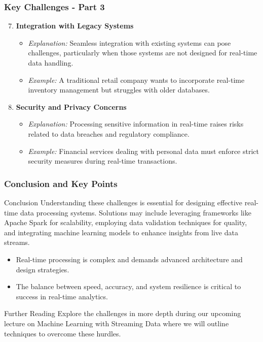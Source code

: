 \documentclass[aspectratio=169]{beamer}
\begin{document}
\begin{frame}[fragile]
    \frametitle{Key Challenges - Part 3}
    \begin{enumerate}
        \setcounter{enumi}{6} %
        \item \textbf{Integration with Legacy Systems}
        \begin{itemize}
            \item \textit{Explanation:} Seamless integration with existing systems can pose challenges, particularly when those systems are not designed for real-time data handling.
            \item \textit{Example:} A traditional retail company wants to incorporate real-time inventory management but struggles with older databases.
        \end{itemize}

        \item \textbf{Security and Privacy Concerns}
        \begin{itemize}
            \item \textit{Explanation:} Processing sensitive information in real-time raises risks related to data breaches and regulatory compliance.
            \item \textit{Example:} Financial services dealing with personal data must enforce strict security measures during real-time transactions.
        \end{itemize}
    \end{enumerate}
\end{frame}

\begin{frame}[fragile]
    \frametitle{Conclusion and Key Points}
    \begin{block}{Conclusion}
        Understanding these challenges is essential for designing effective real-time data processing systems. Solutions may include leveraging frameworks like Apache Spark for scalability, employing data validation techniques for quality, and integrating machine learning models to enhance insights from live data streams.
    \end{block}

    \begin{itemize}
        \item Real-time processing is complex and demands advanced architecture and design strategies.
        \item The balance between speed, accuracy, and system resilience is critical to success in real-time analytics.
    \end{itemize}

    \begin{block}{Further Reading}
        Explore the challenges in more depth during our upcoming lecture on Machine Learning with Streaming Data where we will outline techniques to overcome these hurdles.
    \end{block}
\end{frame}
\end{document}
